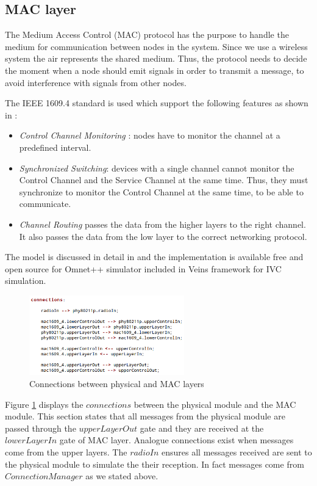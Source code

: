 \subsection{MAC layer}

The Medium Access Control (MAC) protocol has the purpose to handle the medium
for communication between nodes in the system. Since we use a wireless system
the air represents the shared medium. Thus, the protocol needs to decide the
moment when a node should emit signals in order to transmit a message, to avoid
interference with signals from other nodes.

The IEEE 1609.4 standard is used which support the following features as shown
in \cite{phule2012public}:

\begin{itemize}
  \item {\it Control Channel Monitoring} : nodes have to monitor the channel at
  a predefined interval.
  \item {\it Synchronized Switching}: devices with a single channel cannot
  monitor the Control Channel and the Service Channel at the same time. Thus,
  they must synchronize to monitor the Control Channel at the same time, to be
  able to communicate.
  \item {\it Channel Routing} passes the data from the higher layers to the
  right channel. It also passes the data from the low layer to the correct
  networking protocol.
\end{itemize}

The model is discussed in detail in \cite{eckhoff2012multi} and the
implementation is available free and open source for Omnet++ simulator included
in Veins framework for IVC simulation.

\begin{figure}
	\centering
	\includegraphics[width=0.6\textwidth]{img/nic80211p_connections}
	\caption{Connections between physical and MAC layers}
	\label{fig:nic80211p_connections}
\end{figure}
 
Figure \ref{fig:nic80211p_connections} displays the $connections$ between
the physical module and the MAC module. This section states that all messages
from the physical module are passed through the $upperLayerOut$ gate and they
are received at the $lowerLayerIn$ gate of MAC layer. Analogue connections exist
when messages come from the upper layers. The $radioIn$ ensures all messages
received are sent to the physical module to simulate the their reception. In
fact messages come from $ConnectionManager$ as we stated above.

